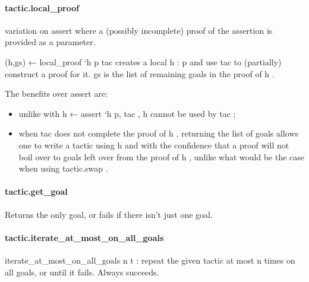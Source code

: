 \documentclass{article}
\begin{document}
\paragraph{tactic.local\_proof}
\par
variation on 
\colorbox[RGB]{253,246,227}{{{{\color[RGB]{133, 153, 0} assert }}}} where a (possibly incomplete)
proof of the assertion is provided as a parameter.
\par
\colorbox[RGB]{253,246,227}{{{{\color[RGB]{101, 123, 131} (h,gs) ← local\_proof `h p tac }}}} creates a local 
\colorbox[RGB]{253,246,227}{{{{\color[RGB]{101, 123, 131} h : p }}}} and
use 
\colorbox[RGB]{253,246,227}{{{{\color[RGB]{101, 123, 131} tac }}}} to (partially) construct a proof for it. 
\colorbox[RGB]{253,246,227}{{{{\color[RGB]{101, 123, 131} gs }}}} is the
list of remaining goals in the proof of 
\colorbox[RGB]{253,246,227}{{{{\color[RGB]{101, 123, 131} h }}}}.
\par
The benefits over assert are:
\begin{itemize}\item unlike with 
\colorbox[RGB]{253,246,227}{{{{\color[RGB]{101, 123, 131} h ←  }}}{{{\color[RGB]{133, 153, 0} assert }}}{{{\color[RGB]{101, 123, 131}  `h p, tac }}}} , 
\colorbox[RGB]{253,246,227}{{{{\color[RGB]{101, 123, 131} h }}}} cannot be used by 
\colorbox[RGB]{253,246,227}{{{{\color[RGB]{101, 123, 131} tac }}}};

\item when 
\colorbox[RGB]{253,246,227}{{{{\color[RGB]{101, 123, 131} tac }}}} does not complete the proof of 
\colorbox[RGB]{253,246,227}{{{{\color[RGB]{101, 123, 131} h }}}}, returning the list
of goals allows one to write a tactic using 
\colorbox[RGB]{253,246,227}{{{{\color[RGB]{101, 123, 131} h }}}} and with the confidence
that a proof will not boil over to goals left over from the proof of 
\colorbox[RGB]{253,246,227}{{{{\color[RGB]{101, 123, 131} h }}}},
unlike what would be the case when using 
\colorbox[RGB]{253,246,227}{{{{\color[RGB]{101, 123, 131} tactic.swap }}}}.

\end{itemize}\paragraph{tactic.get\_goal}
\par
Returns the only goal, or fails if there isn't just one goal.
\paragraph{tactic.iterate\_at\_most\_on\_all\_goals}
\par
\colorbox[RGB]{253,246,227}{{{{\color[RGB]{101, 123, 131} iterate\_at\_most\_on\_all\_goals n t }}}}: repeat the given tactic at most 
\colorbox[RGB]{253,246,227}{{{{\color[RGB]{101, 123, 131} n }}}} times on all goals,
or until it fails. Always succeeds.
\end{document}
